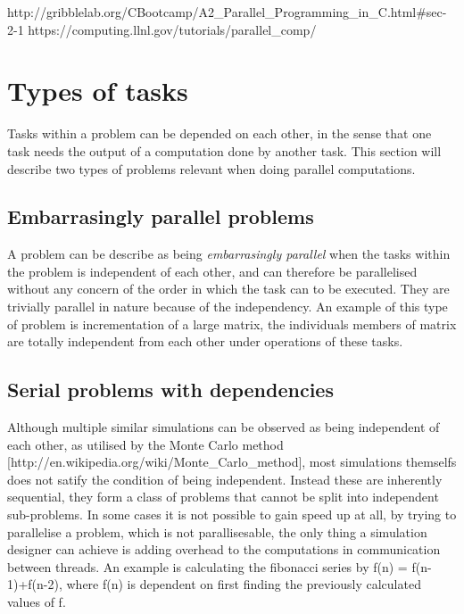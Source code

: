 http://gribblelab.org/CBootcamp/A2_Parallel_Programming_in_C.html#sec-2-1
https://computing.llnl.gov/tutorials/parallel_comp/

\section{Types of tasks}
\label{top}

Tasks within a problem can be depended on each other, in the sense that one task needs the output of a computation done by another task. This section will describe two types of problems relevant when doing parallel computations.

\subsection{Embarrasingly parallel problems}
  A problem can be describe as being \emph{embarrasingly parallel} when the tasks within the problem is independent of each other, and can therefore be parallelised without any concern of the order in which the task can to be executed. They are trivially parallel in nature because of the independency.
  An example of this type of problem is incrementation of a large matrix, the individuals members of matrix are totally independent from each other under operations of these tasks.

\subsection{Serial problems with dependencies}
  Although multiple similar simulations can be observed as being independent of each other, as utilised by the Monte Carlo method [http://en.wikipedia.org/wiki/Monte_Carlo_method], most simulations themselfs does not satify the condition of being independent. Instead these are inherently sequential, they form a class of problems that cannot be split into independent sub-problems. In some cases it is not possible to gain speed up at all, by trying to parallelise a problem, which is not parallisesable, the only thing a simulation designer can achieve is adding overhead to the computations in communication between threads.
  An example is calculating the fibonacci series by f(n) = f(n-1)+f(n-2), where f(n) is dependent on first finding the previously calculated values of f.

